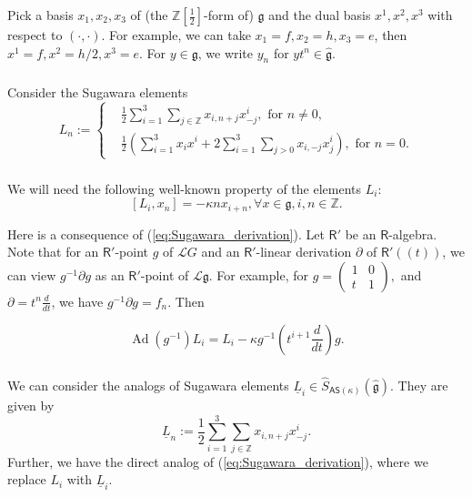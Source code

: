 \documentclass{amsart}
\theoremstyle{definition}
\newcommand{\sss}{\subsubsection{}}
\newcommand{\Ring}{\mathsf{R}}
\newcommand{\g}{\mathfrak{g}}
\newcommand{\hg}{\hat{\mathfrak{g}}}
\newcommand{\Z}{\mathbb{Z}}
\newcommand{\Jet}{\mathscr{J}}
\newcommand{\Loop}{\mathscr{L}}
\newcommand{\AS}{\mathsf{AS}}
\numberwithin{equation}{section}
\begin{document}
Pick a basis $x_1,x_2,x_3$ of (the $\Z[\frac{1}{2}]$-form of) $\g$ and the dual basis $x^1,x^2,x^3$ with respect to $(\cdot,\cdot)$.
For example, we can take $x_1=f, x_2=h, x_3=e$, then $x^1=f, x^2=h/2, x^3=e$. For $y\in \g$, we write $y_n$ for $yt^n\in \hg$.

\sss
Consider the Sugawara elements
\begin{equation}\label{eq:Sugawara_def}
L_n:=\begin{cases}&\frac{1}{2}\sum_{i=1}^3 \sum_{j\in \Z}x_{i,n+j}x^i_{-j}, \text{ for }n\neq 0, \\
&\frac{1}{2}\left(\sum_{i=1}^3 x_ix^i+2\sum_{i=1}^3\sum_{j>0}x_{i,-j}x^i_{j}\right),\text{ for }n=0.\end{cases}
\end{equation}


\sss
We will need the following well-known property of the elements $L_i$:
\begin{equation}\label{eq:Sugawara_derivation}
[L_i,x_n]=-\kappa nx_{i+n}, \forall x\in \g, i,n\in \Z. 
\end{equation}

Here is a consequence of (\ref{eq:Sugawara_derivation}). Let $\Ring'$ be an $\Ring$-algebra. Note that for an $\Ring'$-point $g$ of $\Loop G$ and an $\Ring'$-linear derivation $\partial$ of $\Ring'(\!(t)\!)$, we can view $g^{-1}\partial g$ as an $\Ring'$-point of $\Loop\g$. For example, for $g=\begin{pmatrix}1&0\\t&1\end{pmatrix}, $ and $\partial=t^n \frac{d}{dt}$, we have 
$g^{-1}\partial g=f_{n}$. Then

\begin{equation}\label{eq:Sugawara_adjoint}
\operatorname{Ad}(g^{-1})L_i=L_i-\kappa g^{-1}(t^{i+1}\frac{d}{dt})g. 
\end{equation}

\sss\label{SSS:Sugawara_classical}
We can consider the analogs of Sugawara elements $\underline{L}_i\in \widehat{S}_{\AS(\kappa)}(\hg)$.
They are given by 
\begin{equation}\label{eq:Sugawara_classical}
\underline{L}_n:=\frac{1}{2}\sum_{i=1}^3\sum_{j\in \Z} x_{i,n+j}x^i_{-j}.
\end{equation}
Further, we have the direct analog of (\ref{eq:Sugawara_derivation}), where we replace $L_i$ with $\underline{L}_i$.

\end{document}

